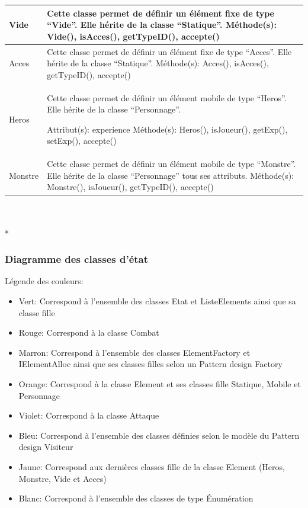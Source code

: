 \documentclass[11pt, a4paper]{article}
\begin{document}
\begin{tabularx}{\textwidth}{ |l|X| }
   Vide & Cette classe permet de définir un élément fixe de type “Vide”. Elle hérite de la classe “Statique”.
\newline
Méthode(s): Vide(), isAcces(), getTypeID(), accepte()
 \\
\hline

   Acces & Cette classe permet de définir un élément fixe de type “Acces”. Elle hérite de la classe “Statique”.
\newline
Méthode(s): Acces(), isAcces(), getTypeID(), accepte()
 \\
\hline

   Heros & Cette classe permet de définir un élément mobile de type “Heros”. Elle hérite de la classe “Personnage”.
   
Attribut(s): experience
\newline
Méthode(s): Heros(), isJoueur(), getExp(), setExp(), accepte()
 \\
\hline

   Monstre & Cette classe permet de définir un élément mobile de type “Monstre”. Elle hérite de la classe “Personnage” tous ses attributs.
\newline
Méthode(s): Monstre(), isJoueur(), getTypeID(), accepte()
 \\
\hline

\end{tabularx}\\ \\*

\subsubsection{Diagramme des classes d'état}

Légende des couleurs:

\begin{itemize}

\item Vert: Correspond à l’ensemble des classes Etat et ListeElements ainsi que sa classe fille
\item Rouge: Correspond à la classe Combat
\item Marron: Correspond à l’ensemble des classes ElementFactory et IElementAlloc ainsi que ses classes filles selon un Pattern design Factory
\item Orange: Correspond à la classe Element et ses classes fille Statique, Mobile et Personnage
\item Violet: Correspond à la classe Attaque
\item Bleu: Correspond à l’ensemble des classes définies selon le modèle du Pattern design Visiteur
\item Jaune: Correspond aux dernières classes fille de la classe Element (Heros, Monstre, Vide et Acces)
\item Blanc: Correspond à l’ensemble des classes de type Énumération

\end{itemize}
\end{document}
